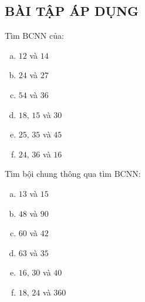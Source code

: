 \subsection{BÀI TẬP ÁP DỤNG}
\begin{bt}
Tìm $\text{BCNN}$ của:
\begin{multicols}{2}
\begin{enumerate}[a)]
\item $12$ và $14$     
\item $24$ và $27$
\item $54$ và $36$
\item $18,\,15$ và $30$
\item $25,\,35$ và $45$
\item $24,\,36$ và $16$
\end{enumerate}
\end{multicols}
\end{bt}   \begin{bt} 
Tìm bội chung thông qua tìm $\text{BCNN}$:
\begin{multicols}{2}
\begin{enumerate}[a)]
\item $13$ và $15$     
\item $48$ và $90$
\item $60$ và $42$
\item $63$ và $35$
\item $16,\,30$ và $40$
\item $18,\,24$ và $360$
\end{enumerate}
\end{multicols}

\end{bt}

